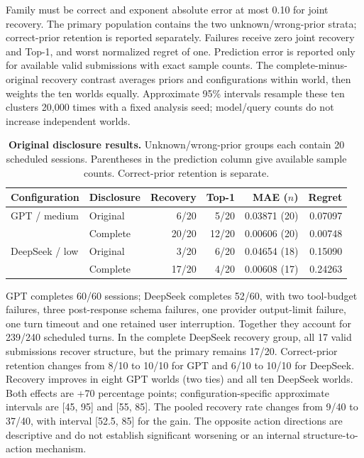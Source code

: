 \documentclass[10pt,twocolumn]{article}
\begin{document}
Family must be correct and exponent absolute error at most 0.10 for
joint recovery. The primary population contains the two
unknown/wrong-prior strata; correct-prior retention is reported
separately. Failures receive zero joint recovery and Top-1, and worst
normalized regret of one. Prediction error is reported only for
available valid submissions with exact sample counts. The
complete-minus-original recovery contrast averages priors and
configurations within world, then weights the ten worlds equally.
Approximate 95\% intervals resample these ten clusters 20,000 times with
a fixed analysis seed; model/query counts do not increase independent
worlds.

\begin{table}[t]
\centering
\small
\caption{\textbf{Original disclosure results.} Unknown/wrong-prior groups each contain 20 scheduled sessions. Parentheses in the prediction column give available sample counts. Correct-prior retention is separate.}
\begin{tabular}{@{}llrrrr@{}}
\toprule
Configuration & Disclosure & Recovery & Top-1 & MAE ($n$) & Regret \\
\midrule
GPT / medium & Original & 6/20 & 5/20 & 0.03871 (20) & 0.07097 \\
 & Complete & 20/20 & 12/20 & 0.00606 (20) & 0.00748 \\
DeepSeek / low & Original & 3/20 & 6/20 & 0.04654 (18) & 0.15090 \\
 & Complete & 17/20 & 4/20 & 0.00608 (17) & 0.24263 \\
\bottomrule
\end{tabular}
\end{table}

GPT completes 60/60 sessions; DeepSeek completes 52/60, with two
tool-budget failures, three post-response schema failures, one provider
output-limit failure, one turn timeout and one retained user
interruption. Together they account for 239/240 scheduled turns. In the
complete DeepSeek recovery group, all 17 valid submissions recover
structure, but the primary remains 17/20. Correct-prior retention
changes from 8/10 to 10/10 for GPT and 6/10 to 10/10 for DeepSeek.
Recovery improves in eight GPT worlds (two ties) and all ten DeepSeek
worlds. Both effects are +70 percentage points; configuration-specific
approximate intervals are {[}45, 95{]} and {[}55, 85{]}. The pooled
recovery rate changes from 9/40 to 37/40, with interval {[}52.5, 85{]}
for the gain. The opposite action directions are descriptive and do not
establish significant worsening or an internal structure-to-action
mechanism.
\end{document}

